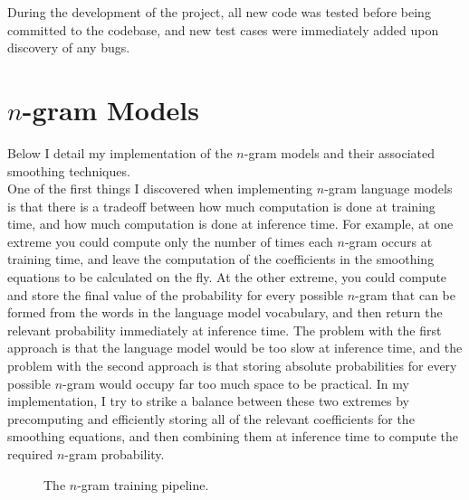 \documentclass[a4paper, 12pt]{report}
\newcommand{\ttt}[1]{\texttt{#1}}
\begin{document}
During the development of the project, all new code was tested before being committed to the codebase, and new test cases were immediately added upon discovery of any bugs.

\section{$n$-gram Models} \label{ngram_lm}

Below I detail my implementation of the $n$-gram models and their associated smoothing techniques. \\

One of the first things I discovered when implementing $n$-gram language models is that there is a tradeoff between how much computation is done at training time, and how much computation is done at inference time. For example, at one extreme you could compute only the number of times each $n$-gram occurs at training time, and leave the computation of the coefficients in the smoothing equations to be calculated on the fly. At the other extreme, you could compute and store the final value of the probability for every possible $n$-gram that can be formed from the words in the language model vocabulary, and then return the relevant probability immediately at inference time. The problem with the first approach is that the language model would be too slow at inference time, and the problem with the second approach is that storing absolute probabilities for every possible $n$-gram would occupy far too much space to be practical. In my implementation, I try to strike a balance between these two extremes by precomputing and efficiently storing all of the relevant coefficients for the smoothing equations, and then combining them at inference time to compute the required $n$-gram probability. \\

\begin{figure}[h]
\captionsetup{justification=centering}
\centering
{}
\caption{The $n$-gram training pipeline.}
\label{fig:ngram_training}
\end{figure}
\end{document}
